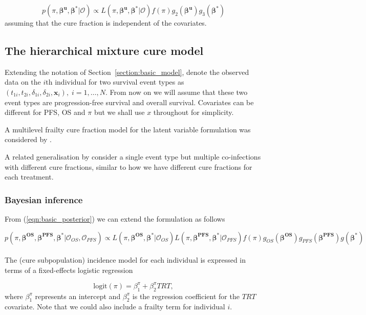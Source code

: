 \documentclass[AMA,STIX1COL]{WileyNJD-v2}
\begin{document}
\begin{equation}
\label{eqn:basic_posterior}
p(\pi, \boldsymbol{\beta^u}, \boldsymbol{\beta^*} | \mathcal{O}) \propto
L(\pi, \boldsymbol{\beta^u}, \boldsymbol{\beta^*} | \mathcal{O}) f(\pi) g_2(\boldsymbol{\beta^u}) g_3(\boldsymbol{\beta^*})
\end{equation}
assuming that the cure fraction is independent of the covariates.

\subsection{The hierarchical mixture cure model}
Extending the notation of Section~\ref{section:basic_model}, denote the observed data on the $i$th individual for two survival event types as $(t_{1i}, t_{2i}, \delta_{1i}, \delta_{2i}, \boldsymbol{x}_i),\; i = 1, \ldots, N$.
From now on we will assume that these two event types are progression-free survival and overall survival.
Covariates can be different for PFS, OS and $\pi$ but we shall use $x$ throughout for simplicity.

A multilevel frailty cure fraction model for the latent variable formulation was considered by \cite{Tawiah2020}.

A related generalisation by \cite{Balogun2020} consider a single event type but multiple co-infections with different cure fractions, similar to how we have different cure fractions for each treatment.

\subsubsection{Bayesian inference}
From (\ref{eqn:basic_posterior}) we can extend the formulation as follows

$$
p(\pi, \boldsymbol{\beta^{OS}}, \boldsymbol{\beta^{PFS}}, \boldsymbol{\beta^*} | \mathcal{O}_{OS}, \mathcal{O}_{PFS}) \propto
L(\pi, \boldsymbol{\beta^{OS}}, \boldsymbol{\beta^*} | \mathcal{O}_{OS}) L(\pi, \boldsymbol{\beta^{PFS}}, \boldsymbol{\beta^*} | \mathcal{O}_{PFS}) f(\pi) g_{OS}(\boldsymbol{\beta^{OS}}) g_{PFS}(\boldsymbol{\beta^{PFS}}) g(\boldsymbol{\beta^*})
$$
\\
\noindent
The (cure subpopulation) incidence model for each individual is expressed in terms of a fixed-effects logistic regression

$$
\text{logit}(\pi) = \beta^{\pi}_1 + \beta^{\pi}_2 TRT,
$$
where $\beta^{\pi}_1$ represents an intercept and $\beta^{\pi}_2$ is the regression coefficient for the $TRT$ covariate.
Note that we could also include a frailty term for individual $i$.
\end{document}

